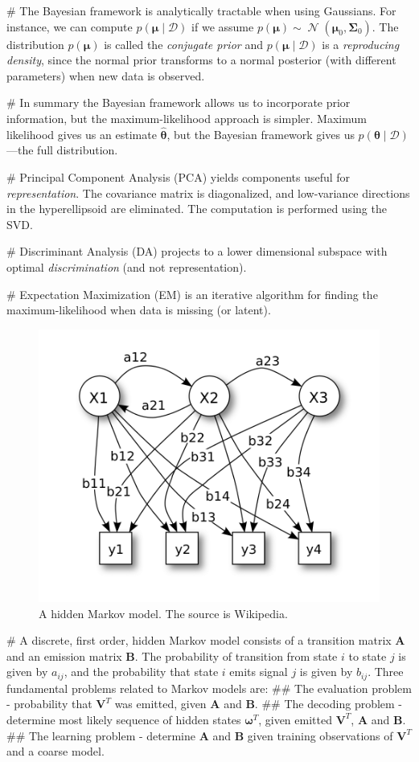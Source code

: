 \documentclass[12pt, a4paper]{article}
\newcommand{\D}{\mathcal{D}}
\newcommand{\vect}[1]{\bm{#1}}
\DeclareMathOperator{\N}{\mathcal{N}}
\begin{document}
\begin{easylist}[itemize]
# The Bayesian framework is analytically tractable when using Gaussians.
For instance, we can compute $p(\vect{\mu} \mid \D)$ if we assume $p(\vect{\mu}) \sim \N(\vect{\mu}_0, \vect{\Sigma}_0)$.
The distribution $p(\vect{\mu})$ is called the \emph{conjugate prior} and $p(\vect{\mu} \mid \D)$ is a \emph{reproducing density}, since the normal prior transforms to a normal posterior (with different parameters) when new data is observed.

# In summary the Bayesian framework allows us to incorporate prior information, but the maximum-likelihood approach is simpler.
Maximum likelihood gives us an estimate $\hat{\vect{\theta}}$, but the Bayesian framework gives us $p(\vect{\theta}  \mid  \D)$---the full distribution.

# Principal Component Analysis (PCA) yields components useful for \emph{representation}.
The covariance matrix is diagonalized, and low-variance directions in the hyperellipsoid are eliminated.
The computation is performed using the SVD.

# Discriminant Analysis (DA) projects to a lower dimensional subspace with optimal \emph{discrimination} (and not representation).

# Expectation Maximization (EM) is an iterative algorithm for finding the maximum-likelihood when data is missing (or latent).

\begin{figure}[ht!]
	\centering
	\includegraphics[width=0.45\linewidth]{figs/hidden_markov}
	\caption{A hidden Markov model. The source is Wikipedia.}
	\label{fig:hidden_markov}
\end{figure}

# A discrete, first order, hidden Markov model consists of a transition matrix $\vect{A}$ and an emission matrix $\vect{B}$.
The probability of transition from state $i$ to state $j$ is given by $a_{ij}$, and the probability that state $i$ emits signal $j$ is given by $b_{ij}$.
Three fundamental problems related to Markov models are:
## The evaluation problem - probability that $\vect{V}^T$ was emitted, given $\vect{A}$ and $\vect{B}$.
## The decoding problem - determine most likely sequence of hidden states $\vect{\omega}^T$, given emitted $\vect{V}^T$, $\vect{A}$ and $\vect{B}$.
## The learning problem - determine $\vect{A}$ and $\vect{B}$ given training observations of $\vect{V}^T$ and a coarse model.



\end{easylist}
\end{document}
